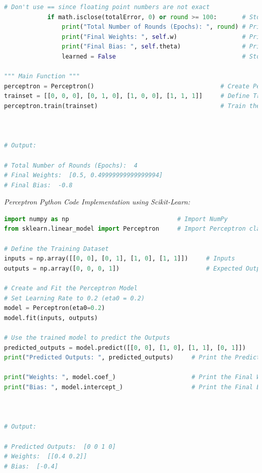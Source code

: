 \documentclass{book}
\begin{document}
\begin{lstlisting}[language=Python, basicstyle=\ttfamily\small, keywordstyle=\color{blue}, commentstyle=\color{forestgreen}, stringstyle=\color{red}, showstringspaces=false]
            # Don't use == since floating point numbers are not exact
            if math.isclose(totalError, 0) or round >= 100:       # Stopping Condition
                print("Total Number of Rounds (Epochs): ", round) # Print the total number of rounds
                print("Final Weights: ", self.w)                  # Print the final weights
                print("Final Bias: ", self.theta)                 # Print the final bias
                learned = False                                   # Stop Learning

""" Main Function """
perceptron = Perceptron()                                   # Create Perceptron Object
trainset = [[0, 0, 0], [0, 1, 0], [1, 0, 0], [1, 1, 1]]     # Define Training Dataset
perceptron.train(trainset)                                  # Train the Perceptron



# Output:

# Total Number of Rounds (Epochs):  4
# Final Weights:  [0.5, 0.49999999999999994]
# Final Bias:  -0.8
\end{lstlisting}
\newpage
\textit{\large{Perceptron Python Code Implementation using Scikit-Learn:}}
\begin{lstlisting}[language=Python, basicstyle=\ttfamily\small, keywordstyle=\color{blue}, commentstyle=\color{forestgreen}, stringstyle=\color{red}, showstringspaces=false]
import numpy as np                              # Import NumPy
from sklearn.linear_model import Perceptron     # Import Perceptron class from Scikit-Learn

# Define the Training Dataset
inputs = np.array([[0, 0], [0, 1], [1, 0], [1, 1]])     # Inputs
outputs = np.array([0, 0, 0, 1])                        # Expected Outputs

# Create and Fit the Perceptron Model
# Set Learning Rate to 0.2 (eta0 = 0.2)
model = Perceptron(eta0=0.2)
model.fit(inputs, outputs)

# Use the trained model to predict the Outputs
predicted_outputs = model.predict([[0, 0], [1, 0], [1, 1], [0, 1]])
print("Predicted Outputs: ", predicted_outputs)     # Print the Predicted Outputs

print("Weights: ", model.coef_)                     # Print the Final Weights
print("Bias: ", model.intercept_)                   # Print the Final Bias



# Output:

# Predicted Outputs:  [0 0 1 0]
# Weights:  [[0.4 0.2]]
# Bias:  [-0.4]
\end{lstlisting}
\end{document}
